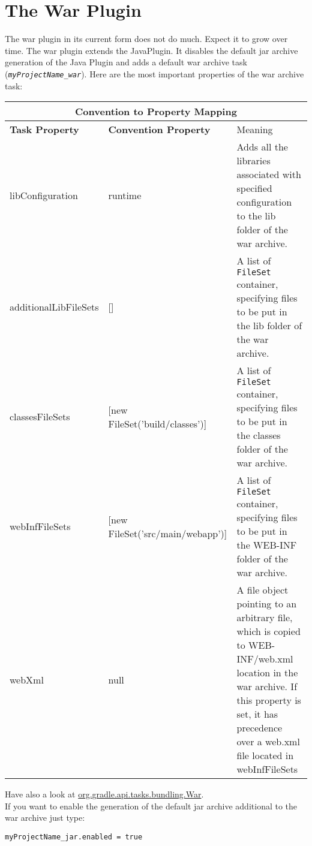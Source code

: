 \chapter{The War Plugin} %
\label{cha:the_war_plugin}
The war plugin in its current form does not do much. Expect it to grow over time. The war plugin extends the JavaPlugin. It disables the default jar archive generation of the Java Plugin and adds a default war archive task (\texttt{\emph{myProjectName\_war}}). Here are the most important properties of the war archive task:
\begin{center}
	\begin{tabular}{|l|l|p{7cm}|} \hline
		\multicolumn{3}{|c|}{Convention to Property Mapping} \\ \hline
	    \textbf{Task Property} & \textbf{Convention Property} & Meaning \\ \hline
		libConfiguration & runtime &  Adds all the libraries associated with specified configuration to the lib folder of the war archive.\\ \hline
		additionalLibFileSets & [] & A list of \texttt{FileSet} container, specifying files to be put in the lib folder of the war archive. \\ \hline
		classesFileSets & [new FileSet('build/classes')] & A list of \texttt{FileSet} container, specifying files to be put in the classes folder of the war archive.\\ \hline
		webInfFileSets & [new FileSet('src/main/webapp')] & A list of \texttt{FileSet} container, specifying files to be put in the WEB-INF folder of the war archive.\\ \hline
		webXml & null & A file object pointing to an arbitrary file, which is copied to WEB-INF/web.xml location in the war archive. If this property is set, it has precedence over a web.xml file located in webInfFileSets\\ \hline
	\end{tabular} 
\end{center}
Have also a look at \href{\API tasks/bundling/War.html}{org.gradle.api.tasks.bundling.War}.
\\

\noindent If you want to enable the generation of the default jar archive additional to the war archive just type:
\begin{Verbatim}
myProjectName_jar.enabled = true
\end{Verbatim}
